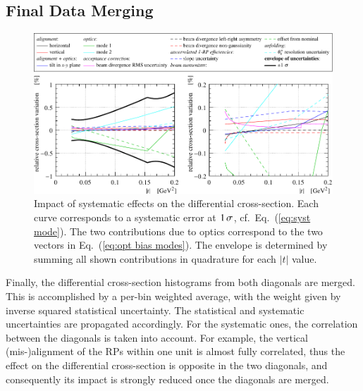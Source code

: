 
\subsection{Final Data Merging}
\label{sec:final data merging}

\begin{figure}[ht]
\begin{center}
\includegraphics{fig/direct_method_mode_cmp_presentation.pdf}
\vskip-3mm
\caption{%
Impact of systematic effects on the differential cross-section. Each curve corresponds to a systematic error at $1\,{\rm \sigma}$, cf.~Eq.~(\ref{eq:syst mode}).
The two contributions due to optics correspond to the two vectors in Eq.~(\ref{eq:opt bias modes}).
The envelope is determined by summing all shown contributions in quadrature for each $|t|$ value.
}
\label{fig:syst unc}
\end{center}
\end{figure}

Finally, the differential cross-section histograms from both diagonals are merged. This is accomplished by a per-bin weighted average, with the weight given by inverse squared statistical uncertainty. The statistical and systematic uncertainties are propagated accordingly. For the systematic ones, the correlation between the diagonals is taken into account. For example, the vertical (mis-)alignment of the RPs within one unit is almost fully correlated, thus the effect on the differential cross-section is opposite in the two diagonals, and consequently its impact is strongly reduced once the diagonals are merged.

